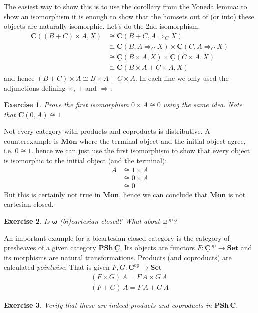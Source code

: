 \documentclass{article}
\newcommand{\Set}{\mathbf{Set}}
\newcommand{\cat}[1]{\underline{\mathbf{#1}}}
\newcommand{\homC}[3]{\cat{#1}(#2,#3)}
\newcommand{\op}{\mathrm{op}}
\newcommand{\PSh}{\mathbf{PSh}}
\newcommand{\expC}[3]{#2\Rightarrow_{#1} #3}
\newtheorem{exercise}{Exercise}
\begin{document}
The easiest way to show this is to use the corollary from the Yoneda lemma: to show an isomorphism it is enough to show that the homsets out of (or into) these objects are naturally isomorphic. Let's do the 2nd isomorphism: 
\begin{align*}
  \homC{C}{(B + C)\times A}{X} 
   & \cong \homC{C}{B+C}{\expC{C}{A}{X}} \\
  & \cong \homC{C}{B}{\expC{C}{A}{X}} \times \homC{C}{C}{\expC{C}{A}{X}} \\
   & \cong \homC{C}{B\times A}{X} \times \homC{C}{C\times A}{X} \\
   & \cong \homC{C}{B \times A + C \times A}{X}
\end{align*}
and hence $(B + C)\times A \cong B\times A + C \times A$.
In each line we only used the adjunctions defining $\times$, $+$ and $\expC{}{}{}$.
\begin{exercise}
  Prove the first isomorphism $0 \times A \cong 0$ using the same idea. Note that $\homC{C}{0}{A} \cong 1$
\end{exercise}

Not every category with products and coproducts is distributive. A counterexample is $\cat{Mon}$ where the terminal object and the initial object agree, i.e. $0 \cong 1$. hence we can just use the first isomorphism to show that every object is isomorphic to the initial object (and the terminal):
\begin{align*}
A & \cong 1 \times A \\
& \cong 0 \times A \\
& \cong 0  
\end{align*}
But this is certainly not true in $\cat{Mon}$, hence we can conclude that $\cat{Mon}$ is not cartesian closed. 

\begin{exercise}
  Is $\cat{\omega}$ (bi)cartesian closed? What about $\cat{\omega}^\op$?
\end{exercise}

An important example for a bicartesian closed category is the category of presheaves of a given category $\PSh\,\cat{C}$. Its objects are functors $F : \cat{C}^\op \to \Set$ and its morphisms are natural transformations. Products (and coproducts) are calculated \emph{pointwise}: That is given $F,G : \cat{C}^\op \to \Set$
\begin{align*}
  (F \times G)\,A = F\,A \times G\,A \\
  (F + G)\, A = F\,A + G\,A
\end{align*}
\begin{exercise}
  Verify that these are indeed products and coproducts in $\PSh\,\cat{C}$.
\end{exercise}
\end{document}
